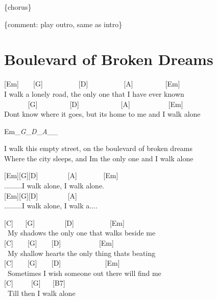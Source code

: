 \documentclass[
  letterpaper,
]{scrbook}
\begin{document}
\{chorus\}

\{comment: play outro, same as intro\}

\hypertarget{boulevard-of-broken-dreams}{%
\chapter{Boulevard of Broken Dreams}\label{boulevard-of-broken-dreams}}

{[}Em{]} ~ ~ {[}G{]} ~ ~ ~ ~ ~ ~{[}D{]} ~ ~ ~ ~ ~ ~{[}A{]} ~ ~ ~ ~ ~
{[}Em{]}\\
I walk a lonely road, the only one that I have ever known\\
\hspace*{0.333em} ~ ~ ~ ~ {[}G{]} ~ ~ ~ ~ ~ {[}D{]} ~ ~ ~ ~ ~ ~ ~{[}A{]}
~ ~ ~ ~ ~ ~ {[}Em{]}\\
Don\textquotesingle t know where it goes, but it\textquotesingle s home
to me and I walk alone

Em\_\emph{\textbar G}\_\emph{\textbar D}\_\emph{\textbar A}\_\_\textbar{}

I walk this empty street, on the boulevard of broken dreams\\
Where the city sleeps, and I\textquotesingle m the only one and I walk
alone

{[}Em{]}{[}G{]}{[}D{]} ~ ~ ~ ~ ~{[}A{]} ~ ~ ~ ~ {[}Em{]}\\
.........I walk alone, I walk alone.\\
{[}Em{]}{[}G{]}{[}D{]} ~ ~ ~ ~ ~{[}A{]}\\
.........I walk alone, I walk a....

{[}C{]} ~ ~{[}G{]} ~ ~ ~ ~ ~{[}D{]} ~ ~ ~ ~ ~ ~{[}Em{]}\\
\hspace*{0.333em} ~My shadow\textquotesingle s the only one that walks
beside me\\
{[}C{]} ~ ~ {[}G{]} ~ ~ {[}D{]} ~ ~ ~ ~ ~ ~ {[}Em{]}\\
\hspace*{0.333em} ~My shallow heart\textquotesingle s the only thing
that\textquotesingle s beating\\
{[}C{]} ~ ~ {[}G{]} ~ ~ {[}D{]} ~ ~ ~ ~ ~ ~ ~ {[}Em{]}\\
\hspace*{0.333em} ~Sometimes I wish someone out there will find me\\
{[}C{]} ~ ~ ~{[}G{]} ~ ~{[}B7{]}\\
\hspace*{0.333em} ~Till then I walk alone
\end{document}
